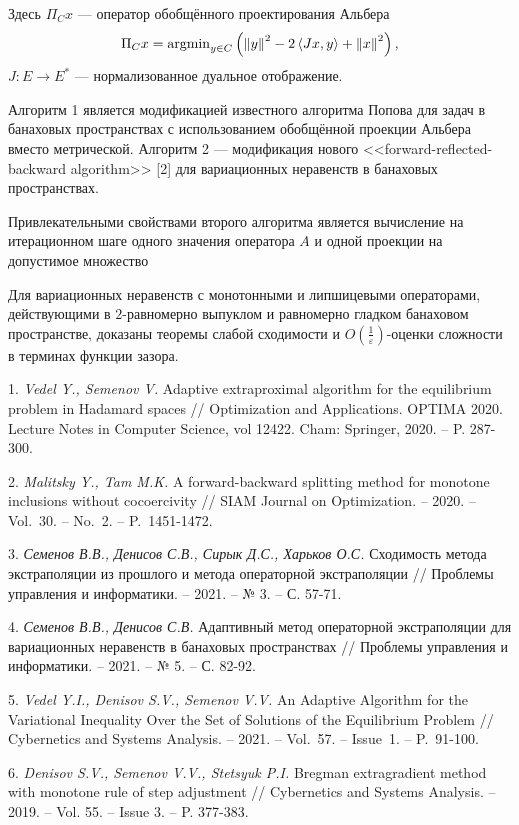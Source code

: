 Здесь $\Pi_{C} x$ --- оператор обобщённого проектирования Альбера
$$
\Pi_{C} x = {\rm argmin}_{y \in C} \left(  \left\| y\right\| ^{2} -2\left\langle Jx, y\right\rangle +\left\| x\right\| ^{2} \right),
$$
$J: E \to E^\ast$ --- нормализованное дуальное отображение.

Алгоритм 1 является модификацией известного алгоритма Попова для задач в банаховых пространствах с использованием обобщённой проекции Альбера вместо метрической. Алгоритм 2 --- модификация нового \foreignlanguage{english}{<<forward-reflected-backward algorithm>>} [2] для вариационных неравенств в банаховых пространствах.

Привлекательными свойствами  второго алгоритма является вычисление на итерационном шаге одного значения оператора $A$ и одной проекции на допустимое множество

Для вариационных неравенств с монотонными и ли\-пши\-цевыми операторами, действующими в  $2$-равномерно выпуклом и равномерно гладком банаховом пространстве, доказаны теоремы слабой сходимости и $O(\frac{1}{\varepsilon})$-оценки сложности в терминах функции зазора.

\litlist

1. {\it Vedel Y., Semenov V.} Adaptive extraproximal algorithm for the equilibrium problem in Hadamard spaces // Optimi\-za\-tion and Applications. OPTIMA 2020. Lecture Notes in Compu\-ter Science, vol 12422. Cham: Springer, 2020. -- P. 287-300.

2. {\it Malitsky Y., Tam M.K.} A forward-backward spli\-tting method for monotone inclusions without cocoercivity // SIAM Journal on Optimization. -- 2020. -- Vol.~30. -- No.~2. -- P.~1451-1472.

3. {\it Семенов В.В.,  Денисов С.В.,  Сирык Д.С.,  Харьков О.С.} Сходимость метода экстраполяции из прошлого и метода операторной экстраполяции // Проблемы управления и информатики. -- 2021. -- № 3. -- С. 57-71.

4. {\it Семенов В.В.,  Денисов С.В.} Адаптивный метод операторной экстраполяции для вариационных неравенств в банаховых пространствах // Проблемы управления и информатики. -- 2021. -- № 5. -- С. 82-92.


5. {\it Vedel  Y.I., Denisov  S.V., Semenov V.V.} An Adaptive Algorithm for the Variational Inequality Over the Set of So\-lu\-tions of the Equilibrium Problem // Cybernetics and Systems Analysis. -- 2021. -- Vol.~57. -- Issue~1. -- P.~91-100.

6. {\it	Denisov S.V., Semenov V.V., Stetsyuk P.I.} Bregman ex\-tra\-gradient me\-thod with monotone rule of step adjustment // Cybernetics and Systems Analysis.  -- 2019. -- Vol. 55. -- Issue 3. -- P. 377-383.
